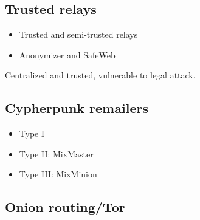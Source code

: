 \documentclass[../overview.tex]{subfiles}
\begin{document}
\subsection{Trusted relays}
\begin{itemize}
	\item Trusted and semi-trusted relays
	\item Anonymizer and SafeWeb
\end{itemize}
Centralized and trusted, vulnerable to legal attack.

\subsection{Cypherpunk remailers}
\begin{itemize}
	\item Type I
	\item Type II: MixMaster
	\item Type III: MixMinion
\end{itemize}
\subsection{Onion routing/Tor}
\end{document}
